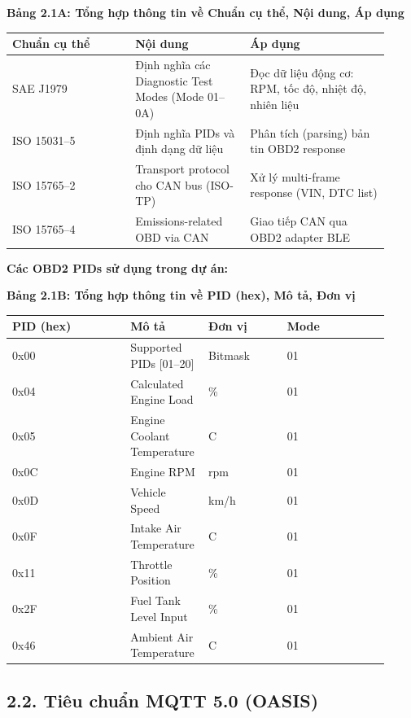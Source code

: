 \documentclass[13pt,a4paper]{extarticle}
\newcounter{none} %
\newcommand{\thesislongtableorignewline}{}
\let\thesislongtableorignewline\\
\renewcommand{\\}{\thesislongtableorignewline\hline}%
\let\\\thesislongtableorignewline
\newcommand{\thesistabletitle}[1]{%
  \begin{center}\textbf{#1}\end{center}%
}
\begin{document}
{\def\LTcaptype{none} %
\thesistabletitle{Bảng 2.1A: Tổng hợp thông tin về Chuẩn cụ thể, Nội dung, Áp dụng}

\begin{longtable}{|p{0.30\linewidth}|p{0.28\linewidth}|p{0.34\linewidth}|}
\hline \textbf{Chuẩn cụ thể} & \textbf{Nội dung} & \textbf{Áp dụng} \\
\hline
\endhead
\hline
\endlastfoot
SAE J1979 & Định nghĩa các Diagnostic Test Modes (Mode 01--0A) & Đọc dữ
liệu động cơ: RPM, tốc độ, nhiệt độ, nhiên liệu \\
ISO 15031--5 & Định nghĩa PIDs và định dạng dữ liệu & Phân tích
(parsing) bản tin OBD2 response \\
ISO 15765--2 & Transport protocol cho CAN bus (ISO-TP) & Xử lý
multi-frame response (VIN, DTC list) \\
ISO 15765--4 & Emissions-related OBD via CAN & Giao tiếp CAN qua OBD2
adapter BLE \\
\end{longtable}
}

\textbf{Các OBD2 PIDs sử dụng trong dự án:}

{\def\LTcaptype{none} %
\thesistabletitle{Bảng 2.1B: Tổng hợp thông tin về PID (hex), Mô tả, Đơn vị}

\begin{longtable}{|p{0.30\linewidth}|p{0.16\linewidth}|p{0.20\linewidth}|p{0.26\linewidth}|}
\hline \textbf{PID (hex)} & \textbf{Mô tả} & \textbf{Đơn vị} & \textbf{Mode} \\
\hline
\endhead
\hline
\endlastfoot
0x00 & Supported PIDs {[}01--20{]} & Bitmask & 01 \\
0x04 & Calculated Engine Load & \% & 01 \\
0x05 & Engine Coolant Temperature & C & 01 \\
0x0C & Engine RPM & rpm & 01 \\
0x0D & Vehicle Speed & km/h & 01 \\
0x0F & Intake Air Temperature & C & 01 \\
0x11 & Throttle Position & \% & 01 \\
0x2F & Fuel Tank Level Input & \% & 01 \\
0x46 & Ambient Air Temperature & C & 01 \\
\end{longtable}
}

\subsection{2.2. Tiêu chuẩn MQTT 5.0
(OASIS)}\label{22-tiuxeau-chuux1ea9n-mqtt-50-oasis}
\end{document}
